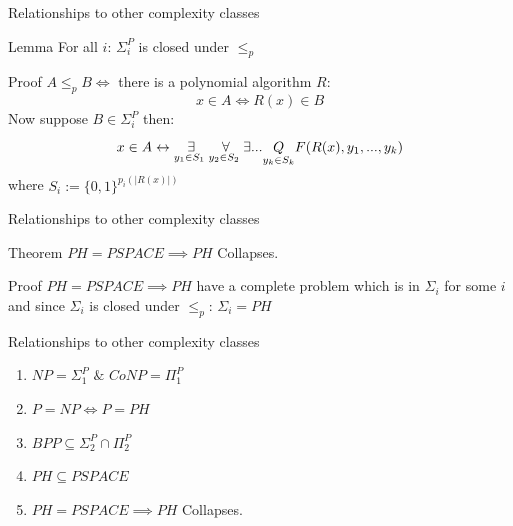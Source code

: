         \begin{frame}{Relationships to other  complexity classes}
            \begin{block}{Lemma}
                For all $i$: $\Sigma_i^P$  is closed under $\leq_p$
            \end{block}
            \pause
            \begin{block}{Proof}
                $A \leq_p B \iff$ there is a polynomial algorithm $R$:
                    $$x\in A \iff R(x) \in B$$
                Now suppose $B \in \Sigma_i^P$ then:
                $$x \in A \leftrightarrow 
                    \overset{{}}{\underset{{y_1 \in S_1\text{ }}}{\Large \exists}}
                    \overset{{}}{\underset{{y_2 \in S_2\text{ }}}{\Large \forall}}
                    \exists ...\underset{y_k \in S_k}{Q} F(R(x),y_1,...,y_k)$$
                where $S_i := \{0,1\}^{p_i(|R(x)|)}$
            \end{block}
        \end{frame}
        \begin{frame}{Relationships to other  complexity classes}
            \begin{block}{Theorem}
                $PH = PSPACE \implies PH$ Collapses.
            \end{block}
            \pause
            \begin{block}{Proof}
                $PH = PSPACE \implies PH$ have a complete problem which is in $\Sigma_i$ for some $i$ and since $\Sigma_i$ is closed under $\leq_p$: $\Sigma_i = PH$
            \end{block}
        \end{frame}
        
        \begin{frame}{Relationships to other  complexity classes}   
            \begin{enumerate}
                \item $NP = \Sigma_1^P $ $\&$ $ CoNP = \Pi_1^P$
                \pause
                \item $P = NP \iff P = PH$
                \pause
                \item $BPP \subseteq \Sigma_2^P \cap \Pi_2^P $
                \pause
                \item $PH \subseteq PSPACE$
                \pause
                \item $PH = PSPACE \implies PH$ Collapses.
            \end{enumerate}
        \end{frame}
        
